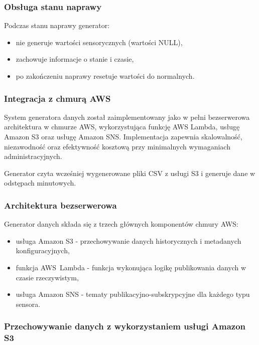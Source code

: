 \subsubsection{Obsługa stanu naprawy}

Podczas stanu naprawy generator:
\begin{itemize}
    \item nie generuje wartości sensorycznych (wartości NULL),
    \item zachowuje informacje o stanie i czasie,
    \item po zakończeniu naprawy resetuje wartości do normalnych.
\end{itemize}

\subsubsection{Integracja z chmurą AWS}
\label{sec:integracja_aws}

System generatora danych został zaimplementowany jako w pełni bezserwerowa architektura w chmurze AWS, wykorzystująca funkcję AWS Lambda, usługę Amazon S3 oraz usługę Amazon SNS. Implementacja zapewnia skalowalność, niezawodność oraz efektywność kosztową przy minimalnych wymaganiach administracyjnych.

Generator czyta wcześniej wygenerowane pliki CSV z usługi S3 i generuje dane w odstępach minutowych.

\subsubsection{Architektura bezserwerowa}
\label{subsec:architektura_bezserwerowa}

Generator danych składa się z trzech głównych komponentów chmury AWS:

\begin{itemize}
    \item usługa Amazon S3 - przechowywanie danych historycznych i metadanych konfiguracyjnych,
    \item funkcja \mbox{AWS Lambda} - funkcja wykonująca logikę publikowania danych w czasie rzeczywistym,
    \item usługa Amazon SNS - tematy publikacyjno-subskrypcyjne dla każdego typu sensora.
\end{itemize}

\subsubsection{Przechowywanie danych z wykorzystaniem usługi Amazon S3}
\label{subsec:amazon_s3}

